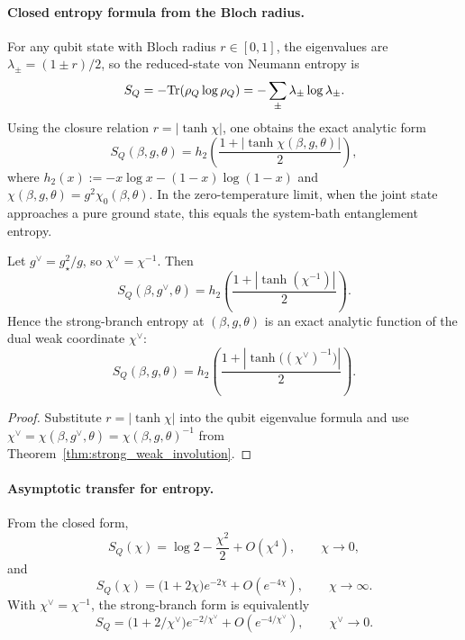 \paragraph{Closed entropy formula from the Bloch radius.}
For any qubit state with Bloch radius \(r\in[0,1]\), the eigenvalues are
\(\lambda_\pm=(1\pm r)/2\), so the reduced-state von Neumann entropy is
\begin{equation}
  S_Q=-\mathrm{Tr}(\rho_Q\log\rho_Q)
  =-\sum_{\pm}\lambda_\pm\log\lambda_\pm.
\end{equation}
Using the closure relation \(r=|\tanh\chi|\), one obtains the exact analytic form
\begin{equation}
  S_Q(\beta,g,\theta)
  =h_2\!\left(\frac{1+|\tanh\chi(\beta,g,\theta)|}{2}\right),
\end{equation}
where \(h_2(x):=-x\log x-(1-x)\log(1-x)\) and
\(\chi(\beta,g,\theta)=g^2\chi_0(\beta,\theta)\). In the zero-temperature limit, when the joint
state approaches a pure ground state, this equals the system-bath entanglement entropy.

\begin{proposition}
\label{prop:dual_entropy_map}
Let \(g^\vee=g_\star^2/g\), so \(\chi^\vee=\chi^{-1}\). Then
\begin{equation}
  S_Q(\beta,g^\vee,\theta)
  =h_2\!\left(\frac{1+|\tanh(\chi^{-1})|}{2}\right).
\end{equation}
Hence the strong-branch entropy at \((\beta,g,\theta)\) is an exact analytic function of the dual
weak coordinate \(\chi^\vee\):
\begin{equation}
  S_Q(\beta,g,\theta)
  =h_2\!\left(\frac{1+|\tanh\!\big((\chi^\vee)^{-1}\big)|}{2}\right).
\end{equation}
\end{proposition}
\begin{proof}
Substitute \(r=|\tanh\chi|\) into the qubit eigenvalue formula and use
\(\chi^\vee=\chi(\beta,g^\vee,\theta)=\chi(\beta,g,\theta)^{-1}\) from
Theorem~\ref{thm:strong_weak_involution}.
\end{proof}

\paragraph{Asymptotic transfer for entropy.}
From the closed form,
\begin{equation}
  S_Q(\chi)=\log 2-\frac{\chi^2}{2}+O(\chi^4),
  \qquad
  \chi\to 0,
\end{equation}
and
\begin{equation}
  S_Q(\chi)=\bigl(1+2\chi\bigr)e^{-2\chi}+O(e^{-4\chi}),
  \qquad
  \chi\to\infty.
\end{equation}
With \(\chi^\vee=\chi^{-1}\), the strong-branch form is equivalently
\begin{equation}
  S_Q=\bigl(1+2/\chi^\vee\bigr)e^{-2/\chi^\vee}+O(e^{-4/\chi^\vee}),
  \qquad
  \chi^\vee\to 0.
\end{equation}

